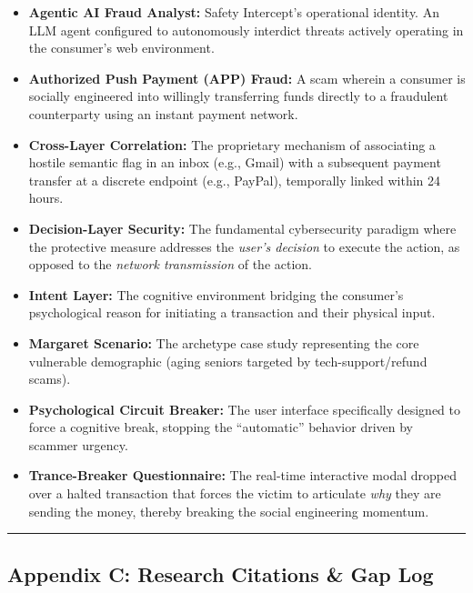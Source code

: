 \documentclass[
]{article}
\providecommand{\tightlist}{%
  \setlength{\itemsep}{0pt}\setlength{\parskip}{0pt}}
\begin{document}
\begin{itemize}
\tightlist
\item
  \textbf{Agentic AI Fraud Analyst:} Safety Intercept's operational
  identity. An LLM agent configured to autonomously interdict threats
  actively operating in the consumer's web environment.
\item
  \textbf{Authorized Push Payment (APP) Fraud:} A scam wherein a
  consumer is socially engineered into willingly transferring funds
  directly to a fraudulent counterparty using an instant payment
  network.
\item
  \textbf{Cross-Layer Correlation:} The proprietary mechanism of
  associating a hostile semantic flag in an inbox (e.g., Gmail) with a
  subsequent payment transfer at a discrete endpoint (e.g., PayPal),
  temporally linked within 24 hours.
\item
  \textbf{Decision-Layer Security:} The fundamental cybersecurity
  paradigm where the protective measure addresses the \emph{user's
  decision} to execute the action, as opposed to the \emph{network
  transmission} of the action.
\item
  \textbf{Intent Layer:} The cognitive environment bridging the
  consumer's psychological reason for initiating a transaction and their
  physical input.
\item
  \textbf{Margaret Scenario:} The archetype case study representing the
  core vulnerable demographic (aging seniors targeted by
  tech-support/refund scams).
\item
  \textbf{Psychological Circuit Breaker:} The user interface
  specifically designed to force a cognitive break, stopping the
  ``automatic'' behavior driven by scammer urgency.
\item
  \textbf{Trance-Breaker Questionnaire:} The real-time interactive modal
  dropped over a halted transaction that forces the victim to articulate
  \emph{why} they are sending the money, thereby breaking the social
  engineering momentum.
\end{itemize}

\begin{center}\rule{0.5\linewidth}{0.5pt}\end{center}

\subsection{Appendix C: Research Citations \& Gap
Log}\label{appendix-c-research-citations-gap-log}
\end{document}
